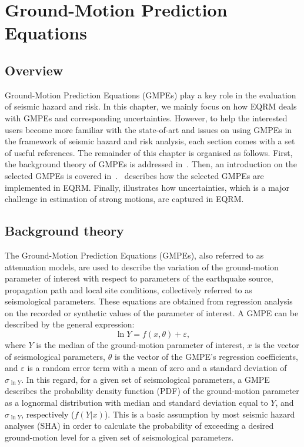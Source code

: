 \chapter{Ground-Motion Prediction Equations}
\label{ch:atten}

\newcommand{\Rhyp}{R_{\mathrm{hyp}}}
\newcommand{\Repi}{R_{\mathrm{epi}}}
\newcommand{\Rrup}{R_{\mathrm{rup}}}
\newcommand{\Rjb}{R_{\mathrm{jb}}}

\section{Overview}

Ground-Motion Prediction Equations (GMPEs) play a key role in the
evaluation of seismic hazard and risk. In this chapter, we mainly
focus on how EQRM deals with GMPEs and corresponding uncertainties.
However, to help the interested users become more familiar with the
state-of-art and issues on using GMPEs in the framework of seismic
hazard and risk analysis, each section comes with a set of useful
references. The remainder of this chapter is organised as follows.
First, the background theory of GMPEs is addressed
in~. Then, an introduction on the selected
GMPEs is covered
in~.~ describes how
the selected GMPEs are implemented in EQRM. Finally,
 illustrates how uncertainties, which is a major
challenge in estimation of strong motions, are captured in EQRM.



\section{Background theory} \label{sec:background} The
Ground-Motion Prediction Equations (GMPEs), also referred to as
attenuation models, are used to describe the variation of the
ground-motion parameter of interest with respect to parameters of
the earthquake source, propagation path and local site conditions,
collectively referred to as seismological parameters. These
equations are obtained from regression analysis on the recorded or
synthetic values of the parameter of interest. A GMPE can be
described by the general expression:
\begin{equation}\label{eq:general}
\ln Y =f(x,\theta)+\varepsilon,
\end{equation}
where $Y$ is the median of the ground-motion parameter of interest,
$x$ is the vector of seismological parameters, $\theta$ is the
vector of the GMPE’s regression coefficients, and $\varepsilon$ is
a random error term with a mean of zero and a standard deviation of
$\sigma_{\ln Y}$. In this regard, for a given set of seismological
parameters, a GMPE describes the probability density function (PDF)
of the ground-motion parameter as a lognormal distribution with
median and standard deviation equal to $Y$, and  $\sigma_{\ln Y}$,
respectively ($f(Y|x)$). This is a basic assumption by most seismic
hazard analyses (SHA) in order to calculate the probability of
exceeding a desired ground-motion level for a given set of
seismological parameters.

